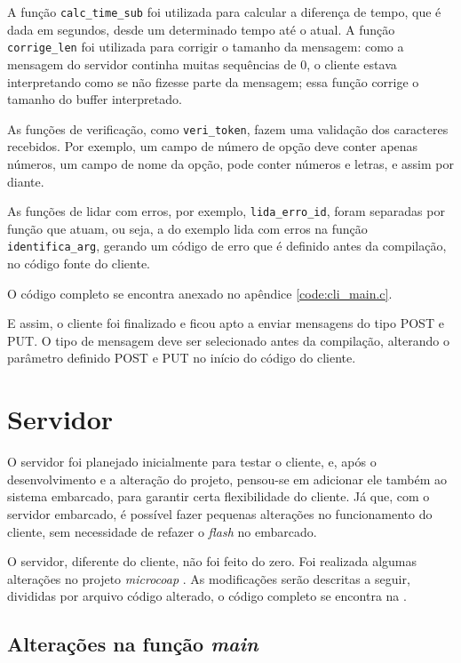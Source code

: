 A função \texttt{calc\_time\_sub} foi utilizada para calcular a diferença de tempo, que é dada em segundos, desde um determinado tempo até o atual.
A função \texttt{corrige\_len} foi utilizada para corrigir o tamanho da mensagem: como a mensagem do servidor continha muitas sequências de 0, o cliente estava interpretando como se não fizesse parte da mensagem; essa função corrige o tamanho do buffer interpretado.

As funções de verificação, como \texttt{veri\_token}, fazem uma validação dos caracteres recebidos. Por exemplo, um campo de número de opção deve conter apenas números, um campo de nome da opção, pode conter números e letras, e assim por diante.

As funções de lidar com erros, por exemplo, \texttt{lida\_erro\_id}, foram separadas por função que atuam, ou seja, a do exemplo lida com erros na função \texttt{identifica\_arg}, gerando um código de erro que é definido antes da compilação, no código fonte do cliente.

O código completo se encontra anexado no apêndice \ref{code:cli_main.c}.

E assim, o cliente foi finalizado e ficou apto a enviar mensagens do tipo POST e PUT. O tipo de mensagem deve ser selecionado antes da compilação, alterando o parâmetro definido POST e PUT no início do código do cliente.

\section{Servidor}

O servidor foi planejado inicialmente para testar o cliente, e, após o desenvolvimento e a alteração do projeto, pensou-se em adicionar ele também ao sistema embarcado, para garantir certa flexibilidade do cliente. Já que, com o servidor embarcado, é possível fazer pequenas alterações no funcionamento do cliente, sem necessidade de refazer o \textit{flash} no embarcado.

O servidor, diferente do cliente, não foi feito do zero. Foi realizada algumas alterações no projeto \textit{microcoap} \cite{microcoap}. As modificações serão descritas a seguir, divididas por arquivo código alterado, o código completo se encontra na \cite{microcoap}. 

\subsection{Alterações na função \textit{main}}

